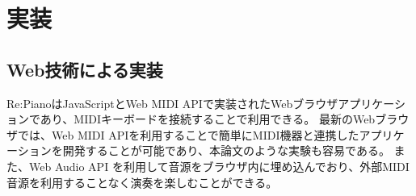 \section{実装}

\subsection{Web技術による実装}
Re:PianoはJavaScriptとWeb MIDI API\cite{webmidi}で実装されたWebブラウザアプリケーションであり、MIDIキーボードを接続することで利用できる。
最新のWebブラウザでは、Web MIDI APIを利用することで簡単にMIDI機器と連携したアプリケーションを開発することが可能であり、本論文のような実験も容易である。
また、Web Audio API\cite{webaudio} を利用して音源をブラウザ内に埋め込んでおり、外部MIDI音源を利用することなく演奏を楽しむことができる。
